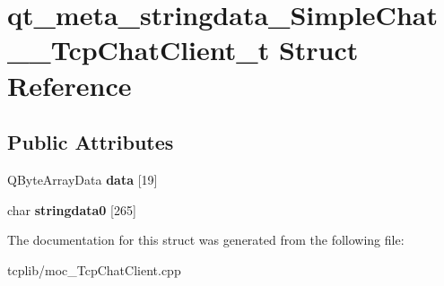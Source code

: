 \hypertarget{structqt__meta__stringdata__SimpleChat____TcpChatClient__t}{\section{qt\-\_\-meta\-\_\-stringdata\-\_\-\-Simple\-Chat\-\_\-\-\_\-\-Tcp\-Chat\-Client\-\_\-t Struct Reference}
\label{structqt__meta__stringdata__SimpleChat____TcpChatClient__t}
}
\subsection*{Public Attributes}
\begin{DoxyCompactItemize}
\item 
\hypertarget{structqt__meta__stringdata__SimpleChat____TcpChatClient__t_ab943545d0c3842a831ff28f739c28f10}{Q\-Byte\-Array\-Data {\bfseries data} \mbox{[}19\mbox{]}}\label{structqt__meta__stringdata__SimpleChat____TcpChatClient__t_ab943545d0c3842a831ff28f739c28f10}

\item 
\hypertarget{structqt__meta__stringdata__SimpleChat____TcpChatClient__t_aed6286420257997aa3893ca982bb0554}{char {\bfseries stringdata0} \mbox{[}265\mbox{]}}\label{structqt__meta__stringdata__SimpleChat____TcpChatClient__t_aed6286420257997aa3893ca982bb0554}

\end{DoxyCompactItemize}


The documentation for this struct was generated from the following file\-:\begin{DoxyCompactItemize}
\item 
tcplib/moc\-\_\-\-Tcp\-Chat\-Client.\-cpp\end{DoxyCompactItemize}
